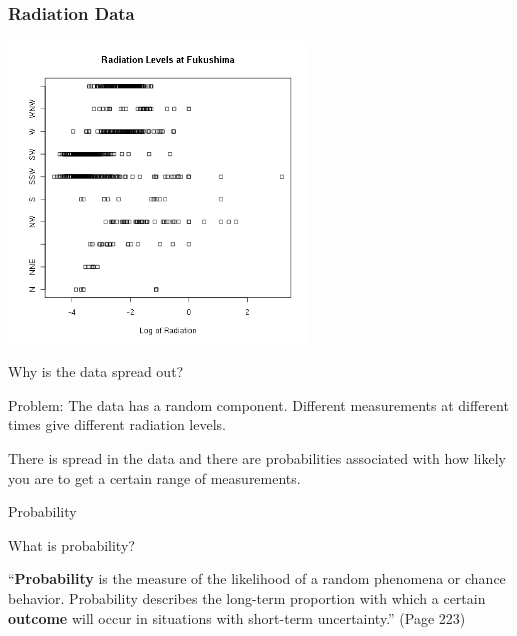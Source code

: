 \begin{frame}
  \frametitle{Radiation Data}

  \begin{center}
    \includegraphics[width=8cm]{img/logFukushimaGammaByDirection}
  \end{center}  

\end{frame}


\begin{frame}{Why is the data spread out?}

  Problem: The data has a random component. Different measurements at
  different times give different radiation levels. 

  \vfill

  There is spread in the data and there are probabilities associated
  with how likely you are to get a certain range of measurements.

  \vfill
  
\end{frame}

\begin{frame}{Probability}

  What is probability?

  \begin{definition}[Probability]
    ``\textbf{Probability} is the measure of the likelihood of a random
    phenomena or chance behavior. Probability describes the long-term
    proportion with which a certain \textbf{outcome} will occur in
    situations with short-term uncertainty.'' (Page 223)
  \end{definition}

  
\end{frame}

